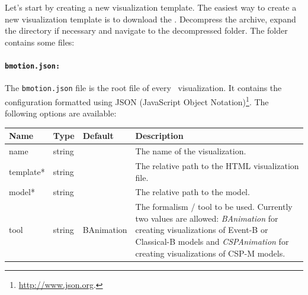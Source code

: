 Let's start by creating a new visualization template.
The easiest way to create a new visualization template is to download the .
Decompress the archive, expand the directory if necessary and navigate to the decompressed folder.
The folder contains some files:



\paragraph{\texttt{bmotion.json:}}
The \texttt{bmotion.json} file is the root file of every \bms\ visualization.
It contains the configuration formatted using JSON (JavaScript Object Notation)\footnote{\url{http://www.json.org}.}.
The following options are available:

\begin{tabular}{ l l l p{7cm} }
  \textbf{Name} & \textbf{Type} & \textbf{Default} & \textbf{Description} \\
  \hline\noalign{\medskip}
  name & string & & The name of the visualization.\\
  \hline\noalign{\medskip}
  template* & string & & The relative path to the HTML visualization file. \\
  \hline\noalign{\medskip}
  model* & string & & The relative path to the model. \\
  \hline\noalign{\medskip}
  tool & string & BAnimation & The formalism / tool to be used. Currently two values are allowed: \textit{BAnimation} for creating visualizations of Event-B or Classical-B models and \textit{CSPAnimation} for creating visualizations of CSP-M models.\\
\end{tabular}

